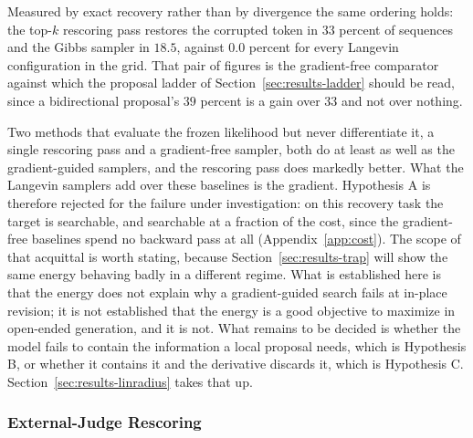 Measured by exact recovery rather than by divergence the same ordering holds: the top-$k$ rescoring pass restores the corrupted token in $33$ percent of sequences and the Gibbs sampler in $18.5$, against $0.0$ percent for every Langevin configuration in the grid. That pair of figures is the gradient-free comparator against which the proposal ladder of Section~\ref{sec:results-ladder} should be read, since a bidirectional proposal's $39$ percent is a gain over $33$ and not over nothing.

Two methods that evaluate the frozen likelihood but never differentiate it, a single rescoring pass and a gradient-free sampler, both do at least as well as the gradient-guided samplers, and the rescoring pass does markedly better. What the Langevin samplers add over these baselines is the gradient. Hypothesis A is therefore rejected for the failure under investigation: on this recovery task the target is searchable, and searchable at a fraction of the cost, since the gradient-free baselines spend no backward pass at all (Appendix~\ref{app:cost}). The scope of that acquittal is worth stating, because Section~\ref{sec:results-trap} will show the same energy behaving badly in a different regime. What is established here is that the energy does not explain why a gradient-guided search fails at in-place revision; it is not established that the energy is a good objective to maximize in open-ended generation, and it is not. What remains to be decided is whether the model fails to contain the information a local proposal needs, which is Hypothesis B, or whether it contains it and the derivative discards it, which is Hypothesis C. Section~\ref{sec:results-linradius} takes that up.

\subsubsection{External-Judge Rescoring}
\label{sec:results-judge}

